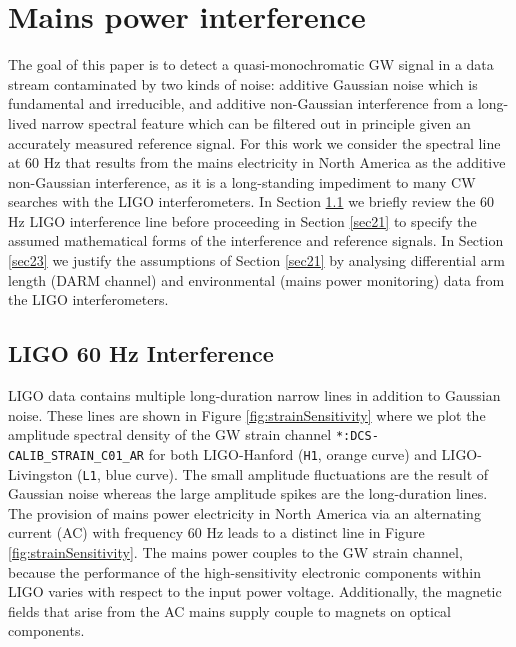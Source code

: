 \documentclass[pra,superscriptaddress,reprint,amsmath,amssymb,nofootinbib]{revtex4-2}
\begin{document}
\section{Mains power interference} \label{sec:pgi}
The goal of this paper is to detect a quasi-monochromatic GW signal in a data stream contaminated by two kinds of noise: additive Gaussian noise which is fundamental and irreducible, and additive non-Gaussian interference from a long-lived narrow spectral feature which can be filtered out in principle given an accurately measured reference signal. For this work we consider the spectral line at 60 Hz that results from the mains electricity in North America as the additive non-Gaussian interference, as it is a long-standing impediment to many CW searches with the LIGO interferometers. In Section \ref{sec22} we briefly review the 60 Hz LIGO interference line before proceeding in Section \ref{sec21} to specify the assumed mathematical forms of the interference and reference signals. In Section \ref{sec23} we justify the assumptions of Section \ref{sec21} by analysing differential arm length (DARM channel) and environmental (mains power monitoring) data from the LIGO interferometers. 


\subsection{LIGO 60 Hz Interference}  \label{sec22}

LIGO data contains multiple long-duration narrow lines in addition to Gaussian noise. These lines are shown in Figure \ref{fig:strainSensitivity} where we plot the amplitude spectral density of the GW strain channel \texttt{*:DCS-CALIB\_STRAIN\_C01\_AR} for both LIGO-Hanford (\texttt{H1}, orange curve) and LIGO-Livingston (\texttt{L1}, blue curve). The small amplitude fluctuations are the result of Gaussian noise whereas the large amplitude spikes are the long-duration lines. The provision of mains power electricity in North America via an alternating current (AC) with frequency 60 Hz leads to a distinct line in Figure  \ref{fig:strainSensitivity}. The mains power couples to the GW strain channel, because the performance of the high-sensitivity electronic components within LIGO varies with respect to the input power voltage. Additionally, the magnetic fields that arise from the AC mains supply couple to magnets on optical components. \newline 
\end{document}
